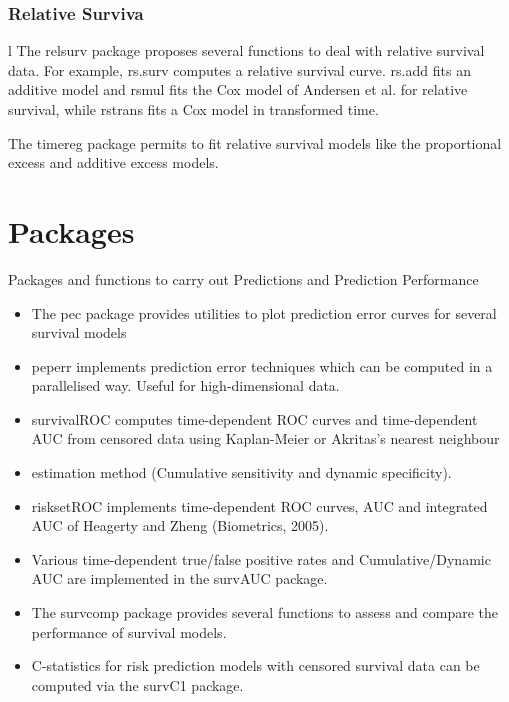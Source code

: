 \documentclass[11pt]{article} %
\begin{document}
\subsubsection{Relative Surviva}l  
The relsurv package proposes several functions to deal with relative survival data. For example, rs.surv computes a relative survival curve. rs.add fits an additive model and rsmul fits the Cox model of Andersen et al. for relative survival, while rstrans fits a Cox model in transformed time.
 
The timereg package permits to fit relative survival models like the proportional excess and additive excess models. 


\section{Packages} 

Packages and functions to carry out Predictions and Prediction Performance 
\begin{itemize}
\item The pec package provides utilities to plot prediction error curves for several survival models 
\item peperr implements prediction error techniques which can be computed in a parallelised way. Useful for high-dimensional data. 
\item survivalROC computes time-dependent ROC curves and time-dependent AUC from censored data using Kaplan-Meier or Akritas's nearest neighbour \item estimation method (Cumulative sensitivity and dynamic specificity). 
\item risksetROC implements time-dependent ROC curves, AUC and integrated AUC of Heagerty and Zheng (Biometrics, 2005). 
\item Various time-dependent true/false positive rates and Cumulative/Dynamic AUC are implemented in the survAUC package. 
\item The survcomp package provides several functions to assess and compare the performance of survival models. 
\item C-statistics for risk prediction models with censored survival data can be computed via the survC1 package. 
\end{itemize}


\newpage 
\end{document}
